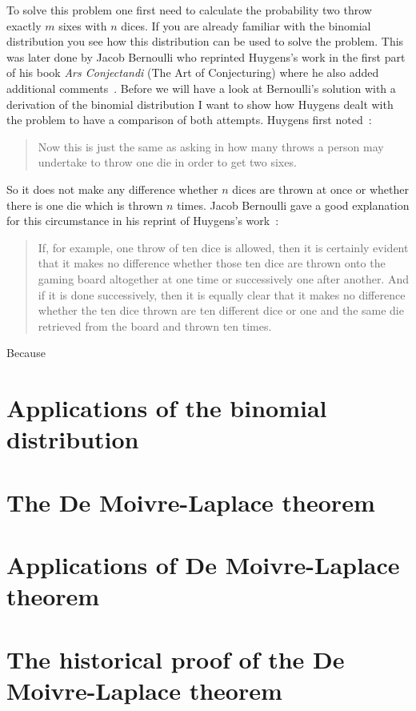 
To solve this problem one first need to calculate the probability two throw exactly $m$ sixes with $n$ dices. If you are already familiar with the binomial distribution you see how this distribution can be used to solve the problem. This was later done by Jacob Bernoulli who reprinted Huygens's work  in the first part of his book \emph{Ars Conjectandi} (The Art of Conjecturing) where he also added additional comments~\cite[p. 63]{bernoulli}. Before we will have a look at Bernoulli's solution with a derivation of the binomial distribution I want to show how Huygens dealt with the problem to have a comparison of both attempts. Huygens first noted~\cite[p. 163]{bernoulli}:

\begin{quotation}
  Now this is just the same as asking in how many throws a person may undertake to throw one die in order to get two sixes.
\end{quotation}

So it does not make any difference whether $n$ dices are thrown at once or whether there is one die which is thrown $n$ times. Jacob Bernoulli gave a good explanation for this circumstance in his reprint of Huygens's work~\cite[p. 163]{bernoulli}:

\begin{quotation}
  If, for example, one throw of ten dice is allowed, then it is certainly evident that it makes no difference whether those ten dice are thrown onto the gaming board altogether at one time or successively one after another. And if it is done successively, then it is equally clear that it makes no difference whether the ten dice thrown are ten different dice or one and the same die retrieved from the board and thrown ten times.
\end{quotation}

Because 

\section{Applications of the binomial distribution}

\section{The De Moivre-Laplace theorem}

\section{Applications of De Moivre-Laplace theorem}

\section{The historical proof of the De Moivre-Laplace theorem}
